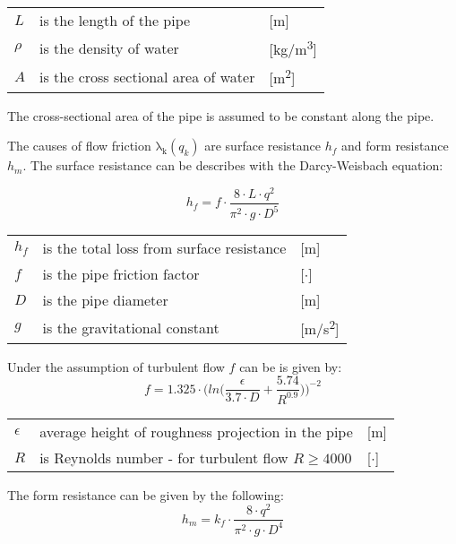 	\begin{center}
		\begin{tabular}{l p{8cm} l}
			$L$ & is the length of the pipe & [\si{m}]\\
			$\rho$ & is the density of water & [\si{kg}/\si{m\cubed}]\\  
			$A$ & is the cross sectional area of water & [\si{m\squared}]\\ 
		\end{tabular}
	\end{center}
The cross-sectional area of the pipe is assumed to be constant along the pipe.

The causes of flow friction $\mathrm{\lambda_{k}}(q_{k})$ are surface resistance $h_{f}$ and form resistance $h_{m}$. The surface resistance can be describes with the Darcy-Weisbach equation:

\begin{equation}
	h_{f} = f \cdot \frac{8\cdot L\cdot q^{2}}{\pi^{2}\cdot g \cdot D^{5}}
\end{equation} 

\begin{center}
	\begin{tabular}{l p{8cm} l}
		$h_{f}$ & is the total loss from surface resistance & [\si{m}]\\
		$f$ & is the pipe friction factor & [$\cdot$]\\
		$D$ & is the pipe diameter & [\si{m}]\\
		$g$ & is the gravitational constant & [\si{m}/\si{s\squared}]\\
	\end{tabular}
\end{center}
Under the assumption of turbulent flow $f$ can be is given by:
\begin{equation}
	f=1.325\cdot \Bigg(ln\Big(\frac{\epsilon}{3.7 \cdot D}+\frac{5.74}{R^{0.9}}\Big)\Bigg)^{-2}
\end{equation}

\begin{center}
	\begin{tabular}{l p{8cm} l}
		$\epsilon$ & average height of roughness projection in the pipe & [\si{m}]\\
		$R$ &  is Reynolds number - for turbulent ﬂow $R \geq 4000$ & [$\cdot$]\\
	\end{tabular}
\end{center}

The form resistance can be given by the following:
\begin{equation}
	h_{m}=k_{f}\cdot \frac{8\cdot q^{2}}{\pi^{2}\cdot g \cdot D^{4}}
\end{equation}

